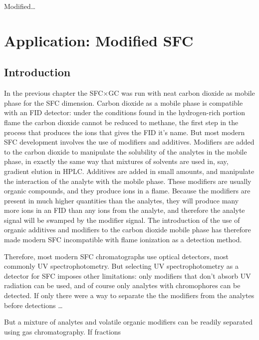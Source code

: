 
\begin{savequote}[45mm]
Modified\ldots
{}
\end{savequote}

\chapter{Application: Modified SFC} %

\label{Chapter7} %

\section{Introduction}

In the previous chapter the SFC×GC was run with neat carbon dioxide as mobile
phase for the SFC dimension. Carbon dioxide as a mobile phase is compatible with
an FID detector: under the conditions found in the hydrogen-rich portion flame
the carbon dioxide cannot be reduced to methane, the first step in the process
that produces the ions that gives the FID it's name. But most modern SFC
development involves the use of modifiers and additives. Modifiers are added to
the carbon dioxide to manipulate the solubility of the analytes in the mobile
phase, in exactly the same way that mixtures of solvents are used in, say,
gradient elution in HPLC. Additives are added in small amounts, and manipulate
the interaction of the analyte with the mobile phase. These modifiers are
usually organic compounds, and they produce ions in a flame. Because the
modifiers are present in much higher quantities than the analytes, they will
produce many more ions in an FID than any ions from the analyte, and therefore
the analyte signal will be swamped by the modifier signal. The introduction of
the use of organic additives and modifiers to the carbon dioxide mobile phase
has therefore made modern SFC incompatible with flame ionization as a detection
method.

Therefore, most modern SFC chromatographs use optical detectors, most commonly
UV spectrophotometry. But selecting UV spectrophotometry as a detector for SFC
imposes other limitations: only modifiers that don't absorb UV radiation can be
used, and of course only analytes with chromophores can be detected. If only
there were a way to separate the the modifiers from the analytes before
detections \ldots

But a mixture of analytes and volatile organic modifiers can be readily
separated using gas chromatography. If fractions

